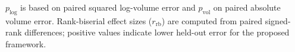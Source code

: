 \begin{table}[!htbp]
\centering
\caption{Paired statistical comparison between the proposed residual framework and baseline methods.}
\label{tab:paired_effect_size_tests}

\vspace{1mm}
\footnotesize{$p_{\mathrm{log}}$ is based on paired squared log-volume error and $p_{\mathrm{vol}}$ on paired absolute volume error. Rank-biserial effect sizes ($r_{\mathrm{rb}}$) are computed from paired signed-rank differences; positive values indicate lower held-out error for the proposed framework.}
\end{table}

